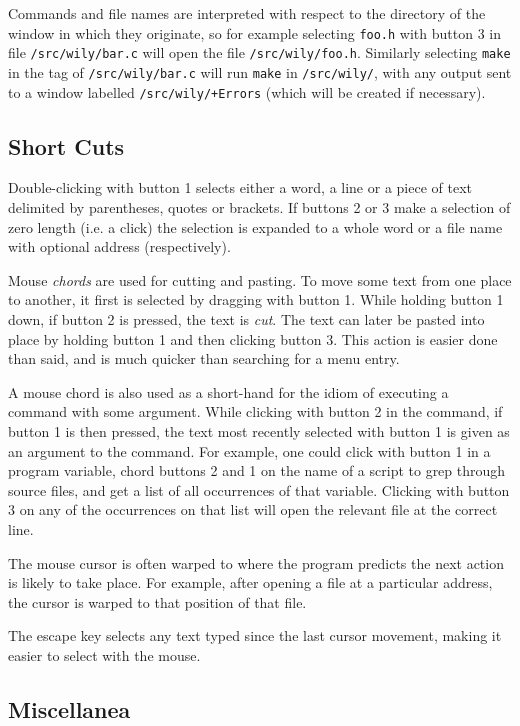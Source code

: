 \documentclass[twocolumn]{article}
\begin{document}
Commands and file names are interpreted with respect to
the directory of the window
in which they originate, so for example selecting \texttt{foo.h}
with button 3 in file \texttt{/src/wily/bar.c} will open the file
\texttt{/src/wily/foo.h}.  Similarly selecting
\texttt{make} in the tag of \texttt{/src/wily/bar.c}
will run \texttt{make} in \texttt{/src/wily/},
with any output
sent to a window labelled \texttt{/src/wily/+Errors} (which
will be created if necessary).

	\subsection{Short Cuts}


Double-clicking with button 1 selects either a word, a line or a
piece of text delimited by parentheses, quotes or brackets.
If buttons 2 or 3 make a selection of
zero length (i.e. a click) the selection is expanded to a whole word or
a file name with optional address (respectively).

Mouse \emph{chords} are used for cutting and pasting.  To move
some text from one place to another, it first is selected by dragging with button 1.
While holding button 1 down, if button 2 is pressed, the text is \emph{cut}.
The text can later be pasted into place by holding button 1 and then clicking
button 3.  This action is easier done than said, and is much quicker than searching
for a menu entry.

A mouse chord is also used as a short-hand for the idiom of executing a command
with some argument.  While clicking with button 2 in the command, if button 1 
is then pressed,  the text most recently selected with button 1 is given
as an argument to the command.  For example, one could click with button 1
in a program variable, chord buttons 2 and 1 on the name of a script to grep
through source files, and get a list of all occurrences of that variable.
Clicking with button 3 on any of the occurrences on that list will open the relevant
file at the correct line.

The mouse cursor is often warped to where the program predicts the next
action is likely to take place.  For example, after opening a file at a particular
address, the cursor is warped to that position of that file.

The escape key selects any text typed since the last cursor movement, making
it easier to select with the mouse.

	\subsection{Miscellanea}
\end{document}

